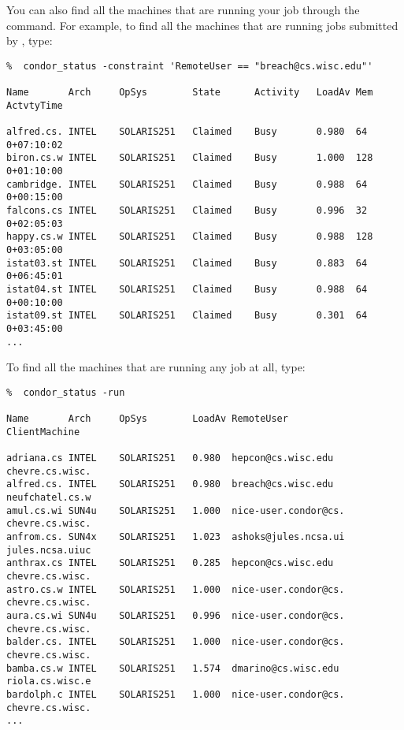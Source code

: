 You can also find all the machines that are running your job through the
 command.
For example, to find all the machines that are
running jobs submitted by , type:
\footnotesize
\begin{verbatim}
%  condor_status -constraint 'RemoteUser == "breach@cs.wisc.edu"'

Name       Arch     OpSys        State      Activity   LoadAv Mem  ActvtyTime

alfred.cs. INTEL    SOLARIS251   Claimed    Busy       0.980  64    0+07:10:02
biron.cs.w INTEL    SOLARIS251   Claimed    Busy       1.000  128   0+01:10:00
cambridge. INTEL    SOLARIS251   Claimed    Busy       0.988  64    0+00:15:00
falcons.cs INTEL    SOLARIS251   Claimed    Busy       0.996  32    0+02:05:03
happy.cs.w INTEL    SOLARIS251   Claimed    Busy       0.988  128   0+03:05:00
istat03.st INTEL    SOLARIS251   Claimed    Busy       0.883  64    0+06:45:01
istat04.st INTEL    SOLARIS251   Claimed    Busy       0.988  64    0+00:10:00
istat09.st INTEL    SOLARIS251   Claimed    Busy       0.301  64    0+03:45:00
...
\end{verbatim}
\normalsize
To find all the machines that are running any job at all, type:
\footnotesize
\begin{verbatim}
%  condor_status -run

Name       Arch     OpSys        LoadAv RemoteUser           ClientMachine  

adriana.cs INTEL    SOLARIS251   0.980  hepcon@cs.wisc.edu   chevre.cs.wisc.
alfred.cs. INTEL    SOLARIS251   0.980  breach@cs.wisc.edu   neufchatel.cs.w
amul.cs.wi SUN4u    SOLARIS251   1.000  nice-user.condor@cs. chevre.cs.wisc.
anfrom.cs. SUN4x    SOLARIS251   1.023  ashoks@jules.ncsa.ui jules.ncsa.uiuc
anthrax.cs INTEL    SOLARIS251   0.285  hepcon@cs.wisc.edu   chevre.cs.wisc.
astro.cs.w INTEL    SOLARIS251   1.000  nice-user.condor@cs. chevre.cs.wisc.
aura.cs.wi SUN4u    SOLARIS251   0.996  nice-user.condor@cs. chevre.cs.wisc.
balder.cs. INTEL    SOLARIS251   1.000  nice-user.condor@cs. chevre.cs.wisc.
bamba.cs.w INTEL    SOLARIS251   1.574  dmarino@cs.wisc.edu  riola.cs.wisc.e
bardolph.c INTEL    SOLARIS251   1.000  nice-user.condor@cs. chevre.cs.wisc.
...
\end{verbatim}
\normalsize

